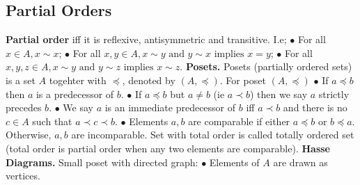 \documentclass{article}
\begin{document}
\subsection{Partial Orders}
\textbf{Partial order } iff it is reflexive, antisymmetric and transitive. I.e;
\newline
\newline
$\bullet $ For all $x \in A, x \sim x$;
\newline
$\bullet $ For all $x, y \in A, x \sim y \text{ and } y \sim x \text{ implies } x = y$;
\newline
$\bullet $ For all $x, y, z \in A, x \sim y \text{ and } y \sim z \text{ implies } x \sim z.$
\newline
\newline
{}
\newline
\newline
{}
\newline
{}
\newline
\newline
\textbf{Posets. } Posets (partially ordered sets) is a set $A$ togehter with $\preceq$, denoted by $(A, \preceq)$. For poset $(A, \preceq)$
\newline
$\bullet $ If $a \preceq b$ then $a$ is a predecessor of $b$.
\newline
$\bullet $ If $a \preceq b$ but $a \not = b$ (ie $a \prec b$) then we say $a$ strictly precedes $b$. 
\newline
$\bullet $ We say $a$ is an immediate predecessor of $b$ iff $a \prec b$ and there is no $c \in A$ such that $a \prec c \prec b.$ 
\newline
$\bullet $ Elements $a, b$ are comparable if either $a \preceq b$ or $b \preceq a$. Otherwise, $a, b$ are incomparable.
\newline
\newline
Set with total order is called totally ordered set (total order is partial order when any two elements are comparable).
\newline
{}
\newline
\newline
\textbf{Hasse Diagrams. } Small poset with directed graph:
\newline
$\bullet $ Elements of $A$ are drawn as vertices.
\end{document}

